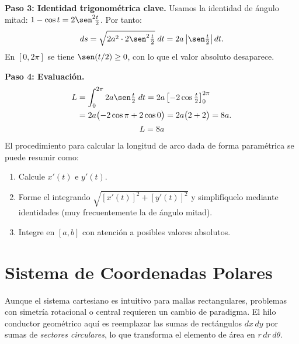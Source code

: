 \begin{example}
\begin{myproof}
\textbf{Paso 3: Identidad trigonométrica clave.}
Usamos la identidad de ángulo mitad:
$1 - \cos t = 2\sen^2\!\tfrac{t}{2}$. Por tanto:
\[
  ds = \sqrt{2a^2 \cdot 2\sen^2\tfrac{t}{2}}\;dt
     = 2a\left|\sen\tfrac{t}{2}\right|dt.
\]
En $[0, 2\pi]$ se tiene $\sen(t/2) \geq 0$, con lo que el valor absoluto
desaparece.

\textbf{Paso 4: Evaluación.}
\begin{align*}
  L &= \int_{0}^{2\pi} 2a\sen\tfrac{t}{2}\;dt
     = 2a\left[-2\cos\tfrac{t}{2}\right]_{0}^{2\pi} \\
    &= 2a\bigl(-2\cos\pi + 2\cos 0\bigr)
     = 2a\bigl(2 + 2\bigr) = 8a.
\end{align*}
\[
  \boxed{L = 8a}
\]
\end{myproof}
\end{example}

\begin{rem} El procedimiento para calcular la longitud de arco dada de forma paramétrica se puede resumir como:

\begin{enumerate} 
  \item Calcule $x'(t)$ e $y'(t)$.
  \item Forme el integrando $\sqrt{[x'(t)]^2 + [y'(t)]^2}$ y simplifíquelo
        mediante identidades (muy frecuentemente la de ángulo mitad).
  \item Integre en $[a,b]$ con atención a posibles valores absolutos.
\end{enumerate}
\end{rem}

\section{Sistema de Coordenadas Polares}

Aunque el sistema cartesiano es intuitivo para mallas rectangulares,
problemas con simetría rotacional o central requieren un cambio de
paradigma. El hilo conductor geométrico aquí es reemplazar las
sumas de rectángulos $dx\,dy$ por sumas de \emph{sectores circulares}, lo
que transforma el elemento de área en $r\,dr\,d\theta$.


